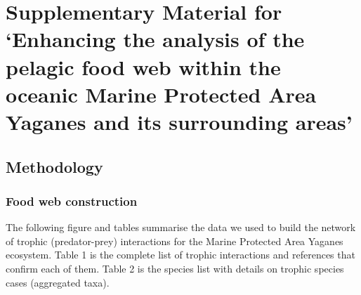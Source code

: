 \documentclass[
]{article}
\author{}
\date{\vspace{-2.5em}}
\begin{document}
\section{Supplementary Material for `Enhancing the analysis of the
pelagic food web within the oceanic Marine Protected Area Yaganes and
its surrounding
areas'}\label{supplementary-material-for-enhancing-the-analysis-of-the-pelagic-food-web-within-the-oceanic-marine-protected-area-yaganes-and-its-surrounding-areas}

\subsection{Methodology}\label{methodology}

\subsubsection{Food web construction}\label{food-web-construction}

The following figure and tables summarise the data we used to build the
network of trophic (predator-prey) interactions for the Marine Protected
Area Yaganes ecosystem. Table 1 is the complete list of trophic
interactions and references that confirm each of them. Table 2 is the
species list with details on trophic species cases (aggregated taxa).
\end{document}

